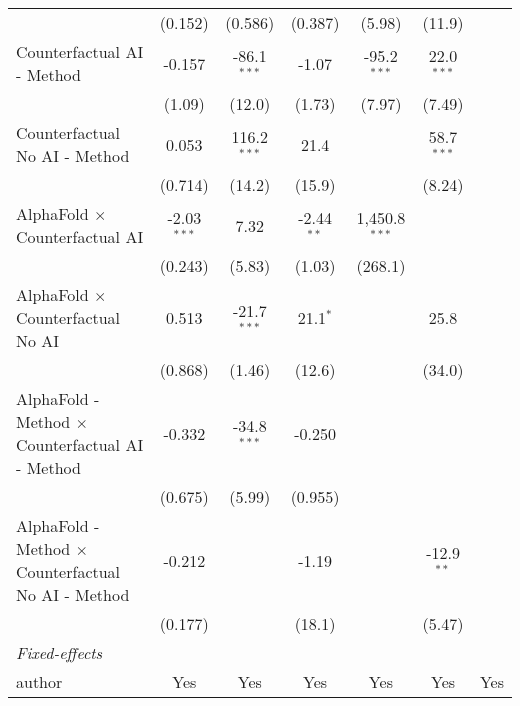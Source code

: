 \begin{tabular}{lcccccc}
                                                              & (0.152)       & (0.586)       & (0.387)      & (5.98)          & (11.9)        &   \\   
   Counterfactual AI - Method                                 & -0.157        & -86.1$^{***}$ & -1.07        & -95.2$^{***}$   & 22.0$^{***}$  &   \\   
                                                              & (1.09)        & (12.0)        & (1.73)       & (7.97)          & (7.49)        &   \\   
   Counterfactual No AI - Method                              & 0.053         & 116.2$^{***}$ & 21.4         &                 & 58.7$^{***}$  &   \\   
                                                              & (0.714)       & (14.2)        & (15.9)       &                 & (8.24)        &   \\   
   AlphaFold $\times$ Counterfactual AI                       & -2.03$^{***}$ & 7.32          & -2.44$^{**}$ & 1,450.8$^{***}$ &               &   \\   
                                                              & (0.243)       & (5.83)        & (1.03)       & (268.1)         &               &   \\   
   AlphaFold $\times$ Counterfactual No AI                    & 0.513         & -21.7$^{***}$ & 21.1$^{*}$   &                 & 25.8          &   \\   
                                                              & (0.868)       & (1.46)        & (12.6)       &                 & (34.0)        &   \\   
   AlphaFold - Method $\times$ Counterfactual AI - Method     & -0.332        & -34.8$^{***}$ & -0.250       &                 &               &   \\   
                                                              & (0.675)       & (5.99)        & (0.955)      &                 &               &   \\   
   AlphaFold - Method $\times$ Counterfactual No AI - Method  & -0.212        &               & -1.19        &                 & -12.9$^{**}$  &   \\   
                                                              & (0.177)       &               & (18.1)       &                 & (5.47)        &   \\   
   \midrule
   \emph{Fixed-effects}\\
   author                                                     & Yes           & Yes           & Yes          & Yes             & Yes           & Yes\\  

\end{tabular}
